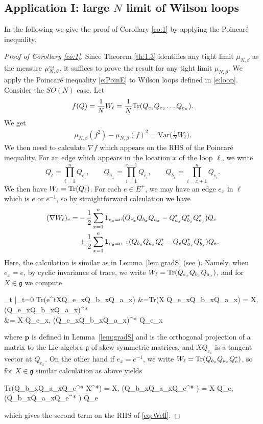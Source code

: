 \documentclass[11pt,UTF-8,reqno]{amsart}
\numberwithin{equation}{section}
\def\proj{\mathbf{p}}
\def\var{{\mathrm{Var}}}
\def\<{{\langle}}
\def\>{{\rangle}}
\def\tr{\mathrm {tr}}
\def\1{{\mathbf{1}}}
\def\<{{\langle}}
\def\>{{\rangle}}
\def\tr{\mathrm {tr}}
\def\tr{{\rm Tr}}
\def\mfg{\mathfrak{g}}
\def\YM{\textnormal{\tiny \textsc{ym}}}
\def\muYM{\mu^{\YM}_{N,\beta}}
\def\<{\langle} \def\>{\rangle}
\begin{document}
\subsection{Application I: large $N$ limit of Wilson loops}

In the following we give the proof of Corollary \ref{co:1} by applying the Poincar\'e inequality.


\begin{proof}[Proof of Corollary \ref{co:1}]
Since Theorem \ref{th:1.3}   identifies any tight limit
$\mu_{N,\beta}$ as the measure $\muYM$, 
it suffices to prove the result for any tight limit $\mu_{N,\beta}$.
	We apply the Poincar\'e inequality \eqref{e:PoinE} to Wilson loops defined in \eqref{e:loop}.
	Consider the $SO(N)$ case.
	Let
	\begin{align*}
		f(Q)=\frac1NW_\ell=\frac1N\tr(Q_{e_1}Q_{e_2}\dots Q_{e_n}).
	\end{align*}
	We get
	\begin{align*}
		\mu_{N,\beta}(f^2)-\mu_{N,\beta}(f)^2=\var\Big(\frac1NW_\ell\Big).
	\end{align*}
	We then need to calculate $\nabla f$ which appears on the RHS of the Poincar\'e inequality.
	For an edge which appears in the location $x$ of the loop $\ell$, we write
	$$
	Q_\ell = \prod_{i=1}^n  Q_{e_i},
	\qquad
	Q_{a_x}=\prod_{i=1}^{x-1}Q_{e_i},
	\qquad
	Q_{b_x}=\prod_{i=x+1}^nQ_{e_i}.
	$$
	We then have $W_\ell=\tr(Q_\ell)$.
	For each $e\in E^+$, we may have an edge $e_x$ in $\ell$ which is $e$ or $e^{-1}$, so by straightforward calculation we have
	\begin{equation}\label{eq:Well}
		\aligned
		(\nabla W_\ell)_{e}=&-\frac12\sum_{x=1}^n\1_{e_x=e}(Q_{e_x}Q_{b_x}Q_{a_x}-Q_{a_x}^*Q_{b_x}^*Q_{e_x}^*)Q_{e}
		\\&+\frac12\sum_{x=1}^n\1_{e_x=e^{-1}}(Q_{b_x}Q_{a_x}Q_{e}^*-Q_{e}Q_{a_x}^*Q_{b_x}^*) Q_{e}.
		\endaligned
	\end{equation}
	Here, the calculation is similar as in Lemma~\ref{lem:gradS} (see \cite{SSZloop}).
	Namely, when $e_x=e$, by cyclic invariance of trace,
	we write $W_\ell=\tr(Q_{e_x}Q_{b_x}Q_{a_x})$, and for $X\in \mfg$
	we compute
	\begin{equs}[e:dW1]
		\partial_t |_{t=0}  \tr(e^{tX}Q_{e_x}Q_{b_x}Q_{a_x})
		&=\tr(X Q_{e_x}Q_{b_x}Q_{a_x})
		= \< X, \proj (Q_{e_x}Q_{b_x}Q_{a_x})^*\>
		\\
		&= \< X Q_{e_x}, \proj (Q_{e_x}Q_{b_x}Q_{a_x})^*  Q_{e_x}\>
	\end{equs}
	where $\proj$ is defined in  Lemma~\ref{lem:gradS}  and is the orthogonal projection of a matrix to the Lie algebra $\mfg$ of skew-symmetric matrices, and $X Q_{e_x}$ is a tangent vector at $ Q_{e_x}$.
On the other hand if $e_x=e^{-1}$, we write $W_\ell=\tr(Q_{b_x}Q_{a_x}Q_{e}^*)$, so
 for $X\in \mfg$ similar calculation as above yields
	\begin{equ}[e:dW2]
	\tr(Q_{b_x}Q_{a_x}Q_{e}^* X^*)
		= \< X, \proj (Q_{b_x}Q_{a_x}Q_{e}^* )\>
		= \< X Q_{e}, \proj (Q_{b_x}Q_{a_x}Q_{e}^* ) Q_{e}\>
	\end{equ}
which gives the second term on the RHS of \eqref{eq:Well}.


\end{proof}
\end{document}
